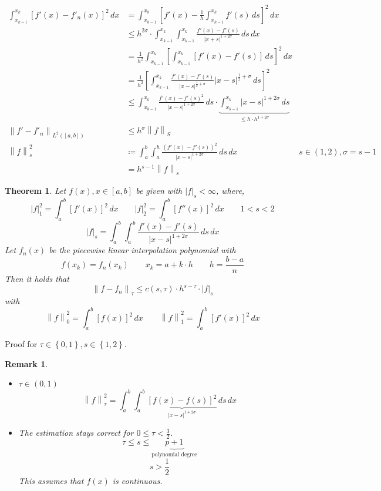\documentclass{article}
\newtheorem{theorem}{Theorem}
\newtheorem*{remark}{Remark}
\newcommand{\set}[1]{\left\{#1\right\}}
\newcommand{\card}[1]{\left|#1\right|}
\newcommand{\norm}[1]{\left\|#1\right\|}
\begin{document}
\begin{align*}
  \int_{x_{k-1}}^{x_k} \left[f'(x) - f'_n(x)\right]^2 \, dx
    &= \int_{x_{k-1}}^{x_k} \left[f'(x) - \frac1h \int_{x_{k-1}}^{x_k} f'(s) \, ds\right]^2 \, dx \\
    &\leq h^{2\sigma} \cdot \int_{x_{k-1}}^{x_k} \int_{x_{k-1}}^{x_k} \frac{f'(x) - f'(s)}{\card{x + s}^{1 + 2\sigma}} \, ds \, dx \\
    &= \frac1{h^2} \int_{x_{k-1}}^{x_k} \left[ \int_{x_{k-1}}^{x_k} \left[f'(x) - f'(s) \right] \, ds \right]^2 \, dx \\
    &= \frac1{h^2} \left[\int_{x_{k-1}}^{x_k} \frac{f'(x) - f'(s)}{\card{x - s}^{\frac12 + \sigma}} \card{x - s}^{\frac12 + \sigma} \, ds\right]^2 \\
    &\leq \int_{x_{k-1}}^{x_k} \frac{{f'(x) - f'(s)}^2}{\card{x - s}^{1 + 2\sigma}} \, ds \cdot \underbrace{\int_{x_{k-1}}^{x_k} \card{x - s}^{1 + 2\sigma} \, ds}_{\leq h \cdot h^{1 + 2\sigma}} \\
  \norm{f' - f'_n}_{L^2([a,b])}
    &\leq h^\sigma \norm{f}_S \\
  \norm{f}_s^2 &\coloneqq \int_a^b \int_a^h \frac{(f'(x) - f'(s))^2}{\card{x - s}^{1 + 2\sigma}} \, ds \, dx  & s \in (1,2), \sigma = s - 1 \\
    &= h^{s - 1} \norm{f}_s
\end{align*}

\begin{theorem}
  Let $f(x), x \in [a,b]$ be given with $\card{f}_s < \infty$, where,
  \[
    \card{f}_1^2 = \int_a^b [f'(x)]^2 \, dx \qquad
    \card{f}_2^2 = \int_a^b [f''(x)]^2 \, dx \qquad 1 < s < 2
  \] \[
    \card{f}_s = \int_a^b \int_a^b \frac{f'(x) - f'(s)}{\card{x - s}^{1 + 2\sigma}} \, ds \, dx
  \]
  Let $f_n(x)$ be the piecewise linear interpolation polynomial with
  \[ f(x_k) = f_n(x_k) \qquad x_k = a + k \cdot h \qquad h = \frac{b - a}{n} \]
  Then it holds that
  \[
    \norm{f - f_n}_{\tau} \leq c(s, \tau) \cdot h^{s - \tau} \cdot \card{f}_s
  \]
  with
  \[
    \norm{f}_0^2 = \int_a^b [f(x)]^2 \, dx \qquad
    \norm{f}_1^2 = \int_a^b [f'(x)]^2 \, dx
  \]
\end{theorem}

Proof for $\tau \in \set{0,1}, s \in \set{1,2}$.

\begin{remark}
  \begin{itemize}
    \item $\tau \in (0,1)$
      \[ \norm{f}_\tau^2 = \int_a^b \int_a^b \underbrace{\left[f(x) - f(s)\right]^2}_{\card{x - s}^{1 + 2\sigma}} \, ds \, dx \]
    \item The estimation stays correct for $0 \leq \tau < \frac32$.
      \[ \tau \leq s \leq \underbrace{p + 1}_{\text{polynomial degree}} \]
      \[ s > \frac12 \]
      This assumes that $f(x)$ is continuous.
  \end{itemize}
\end{remark}
\end{document}

